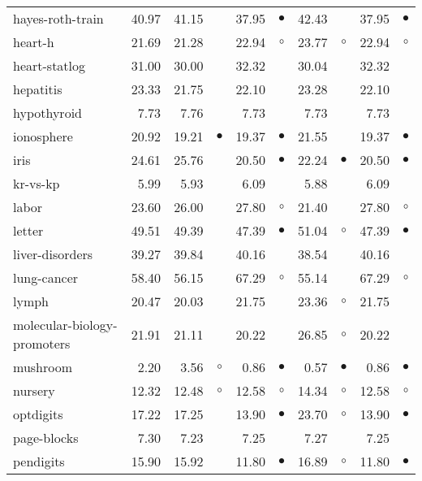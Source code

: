 {\begin{longtable}{lrr@{\hspace{0.1cm}}cr@{\hspace{0.1cm}}cr@{\hspace{0.1cm}}cr@{\hspace{0.1cm}}c}
hayes-roth-train & 40.97 & 41.15 &           & 37.95 & $\bullet$ & 42.43 &           & 37.95 & $\bullet$\\
heart-h & 21.69 & 21.28 &           & 22.94 &   $\circ$ & 23.77 &   $\circ$ & 22.94 &   $\circ$\\
heart-statlog & 31.00 & 30.00 &           & 32.32 &           & 30.04 &           & 32.32 &          \\
hepatitis & 23.33 & 21.75 &           & 22.10 &           & 23.28 &           & 22.10 &          \\
hypothyroid &  7.73 &  7.76 &           &  7.73 &           &  7.73 &           &  7.73 &          \\
ionosphere & 20.92 & 19.21 & $\bullet$ & 19.37 & $\bullet$ & 21.55 &           & 19.37 & $\bullet$\\
iris & 24.61 & 25.76 &           & 20.50 & $\bullet$ & 22.24 & $\bullet$ & 20.50 & $\bullet$\\
kr-vs-kp &  5.99 &  5.93 &           &  6.09 &           &  5.88 &           &  6.09 &          \\
labor & 23.60 & 26.00 &           & 27.80 &   $\circ$ & 21.40 &           & 27.80 &   $\circ$\\
letter & 49.51 & 49.39 &           & 47.39 & $\bullet$ & 51.04 &   $\circ$ & 47.39 & $\bullet$\\
liver-disorders & 39.27 & 39.84 &           & 40.16 &           & 38.54 &           & 40.16 &          \\
lung-cancer & 58.40 & 56.15 &           & 67.29 &   $\circ$ & 55.14 &           & 67.29 &   $\circ$\\
lymph & 20.47 & 20.03 &           & 21.75 &           & 23.36 &   $\circ$ & 21.75 &          \\
molecular-biology-promoters & 21.91 & 21.11 &           & 20.22 &           & 26.85 &   $\circ$ & 20.22 &          \\
mushroom &  2.20 &  3.56 &   $\circ$ &  0.86 & $\bullet$ &  0.57 & $\bullet$ &  0.86 & $\bullet$\\
nursery & 12.32 & 12.48 &   $\circ$ & 12.58 &   $\circ$ & 14.34 &   $\circ$ & 12.58 &   $\circ$\\
optdigits & 17.22 & 17.25 &           & 13.90 & $\bullet$ & 23.70 &   $\circ$ & 13.90 & $\bullet$\\
page-blocks &  7.30 &  7.23 &           &  7.25 &           &  7.27 &           &  7.25 &          \\
pendigits & 15.90 & 15.92 &           & 11.80 & $\bullet$ & 16.89 &   $\circ$ & 11.80 & $\bullet$\\

\end{longtable}}

